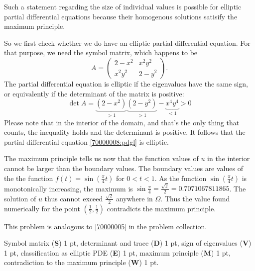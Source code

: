 \begin{loesung}
Such a statement regarding the size of individual values is possible
for elliptic partial differential equations because their homogenous
solutions satisify the maximum principle.

So we first check whether we do have an elliptic partial differential
equation.
For that purpose, we need the symbol matrix, which happens to be
\[
A=\begin{pmatrix}
2-x^2 &x^2y^2\\
x^2y^2&2-y^2
\end{pmatrix}.
\]
The partial differential equation is elliptic if the eigenvalues
have the same sign, or equivalently if the determinant of the matrix
is positive:
\[
\det A=\underbrace{(2-x^2)}_{> 1}\underbrace{(2-y^2)}_{> 1}-\underbrace{x^4y^4}_{< 1}>0
\]
Please note that in the interior of the domain, and that's the only
thing that counts, the inequality holds and the determinant is
positive.
It follows that the partial differential equation
\eqref{70000008:pdgl} is elliptic.

The maximum principle tells us now that the function values of $u$
in the interior cannot be larger than the boundary values.
The boundary values are values of the the function
$f(t)=\sin(\frac\pi4t)$ for $0<t<1$.
As the function
$\sin(\frac\pi4t)$ is monotonically increasing, the maximum
is $\sin\frac\pi4=\frac{\sqrt{2}}2=0.7071067811865$.
The solution of $u$ thus cannot exceed 
$\frac{\sqrt{2}}2$ anywhere in $\Omega$.
Thus the value found numerically for the point
$(\frac12,\frac12)$ contradicts the maximum principle.
\end{loesung}

\begin{diskussion}
This problem is analogous to
\ref{70000005} in the problem collection.
\end{diskussion}

\begin{bewertung}
Symbol matrix ({\bf S}) 1 pt,
determinant and trace ({\bf D}) 1 pt,
sign of eigenvalues ({\bf V}) 1 pt,
classification as elliptic PDE ({\bf E}) 1 pt,
maximum principle ({\bf M}) 1 pt,
contradiction to the maximum principle ({\bf W}) 1 pt.
\end{bewertung}
